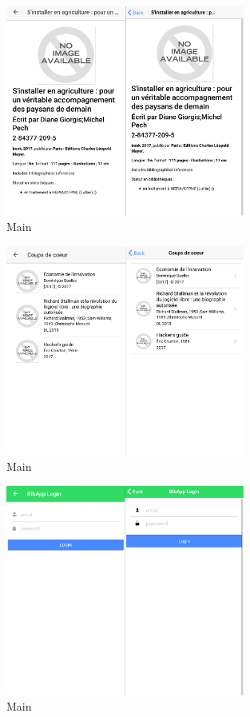 \documentclass[a4paper, 12pt]{article}
\begin{document}
\begin{figure}
    \begin{center}
        \includegraphics[width=0.7\textwidth]{images/screenshots/android_iphone_3.png}
    \end{center}
    \caption{Main}
\end{figure}
\begin{figure}
    \begin{center}
        \includegraphics[width=0.7\textwidth]{images/screenshots/android_iphone_4.png}
    \end{center}
    \caption{Main}
\end{figure}
\begin{figure}
    \begin{center}
        \includegraphics[width=0.7\textwidth]{images/screenshots/android_iphone_5.png}
    \end{center}
    \caption{Main}
\end{figure}
\end{document}
